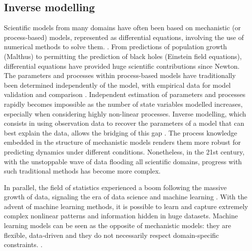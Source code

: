 \subsection{Inverse modelling}
Scientific models from many domains have often been based on mechanistic (or process-based) models, represented as differential equations, involving the use of numerical methods to solve them. .
From predictions of population growth (Malthus) to permitting the prediction of black holes (Einstein field equations), differential equations have provided huge scientific contributions since Newton.
% 
The parameters and processes within process-based models have traditionally been determined independently of the model, with empirical data for model validation and comparison \cite{hartig2012}. Independent estimation of parameters and processes rapidly becomes impossible as the number of state variables modelled increases, especially when considering highly non-linear processes. 
Inverse modelling, which consists in using observation data to recover the parameters of a model that can best explain the data, allows the bridging of this gap \cite{Wigner.1960, Rude:2018jv}. 
% 
The process knowledge embedded in the structure of mechanistic models renders them more robust for predicting dynamics under different conditions.
% 
Nonetheless, in the 21st century, with the unstoppable wave of data flooding all scientific domains, progress with such traditional methods has become more complex. 

In parallel, the field of statistics experienced a boom following the massive growth of data, signaling the era of data science and machine learning \cite{Cox:2017hv}.
With the advent of machine learning methods, it is possible to learn and capture extremely complex nonlinear patterns and information hidden in huge datasets. 
Machine learning models can be seen as the opposite of mechanistic models: they are flexible, data-driven and they do not necessarily respect domain-specific constraints. .

